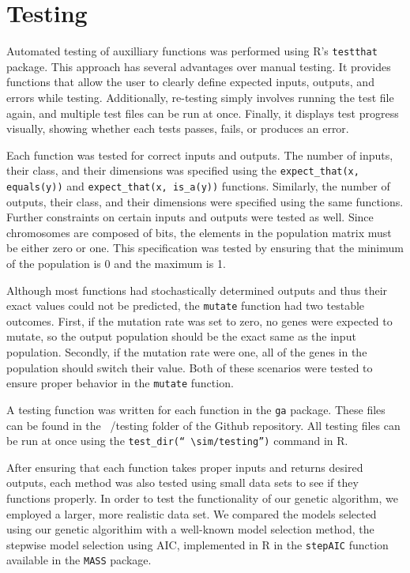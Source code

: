 \documentclass[11pt]{article}
\begin{document}
\section{Testing} 
\label{sec:testing}
Automated testing of auxilliary functions was performed using R's \texttt{testthat} package. This approach has several advantages over manual testing. It provides functions that allow the user to clearly define expected inputs, outputs, and errors while testing. Additionally, re-testing simply involves running the test file again, and multiple test files can be run at once. Finally, it displays test progress visually, showing whether each tests passes, fails, or produces an error.

Each function was tested for correct inputs and outputs. The number of
inputs, their class, and their dimensions was specified using the
\texttt{expect\_that(x, equals(y))} and \texttt{expect\_that(x,
  is\_a(y))} functions. Similarly, the number of outputs, their class,
and their dimensions were specified using the same
functions. Further constraints on certain inputs and outputs were tested as
well. Since chromosomes are composed of bits, the elements in the
population matrix must be either zero or one. This specification was
tested by ensuring that the minimum of the population is 0 and the
maximum is 1.

Although most functions had stochastically determined outputs and thus
their exact values could not be predicted, the \texttt{mutate}
function had two testable outcomes. First, if the mutation rate was
set to zero, no genes were expected to mutate, so the output
population should be the exact same as the input population. Secondly,
if the mutation rate were one, all of the genes in the population
should switch their value. Both of these scenarios were tested to
ensure proper behavior in the \texttt{mutate} function.

A testing function was written for each function in the \texttt{ga}
package. These files can be found in the ~/testing folder of the
Github repository. All testing files can be run at once using the
\texttt{test\_dir(`` $\sim$/testing'')} command in R.

After ensuring that each function takes proper inputs and returns desired outputs,
each method was also tested using small data sets to see if they functions properly.
In order to test the functionality of our genetic algorithm, we employed a larger, more 
realistic data set. We compared the models selected using our genetic algorithim with a 
well-known model selection method, the stepwise model selection using AIC, 
implemented in R in the \texttt{stepAIC} function available in the 
\texttt{MASS} package.
\end{document}
